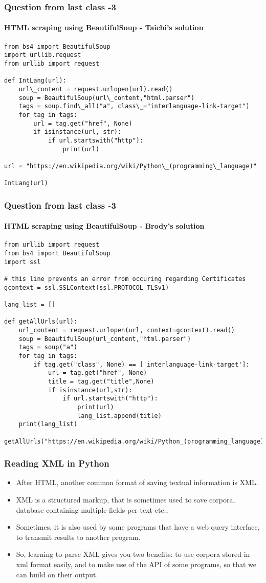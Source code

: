 \documentclass{beamer}
\begin{document}
\begin{frame}[fragile]
\frametitle{Question from last class -3}
\framesubtitle{HTML scraping using BeautifulSoup - Taichi's solution}
\tiny
\begin{verbatim}
from bs4 import BeautifulSoup
import urllib.request
from urllib import request

def IntLang(url):
    url\_content = request.urlopen(url).read()
    soup = BeautifulSoup(url\_content,"html.parser")
    tags = soup.find\_all("a", class\_="interlanguage-link-target")
    for tag in tags:
        url = tag.get("href", None)
        if isinstance(url, str):
            if url.startswith("http"):
                print(url)

url = "https://en.wikipedia.org/wiki/Python\_(programming\_language)"

IntLang(url)
\end{verbatim}
\end{frame}

\begin{frame}[fragile]
\frametitle{Question from last class -3}
\framesubtitle{HTML scraping using BeautifulSoup - Brody's solution}
\tiny
\begin{verbatim}
from urllib import request
from bs4 import BeautifulSoup
import ssl

# this line prevents an error from occuring regarding Certificates
gcontext = ssl.SSLContext(ssl.PROTOCOL_TLSv1)

lang_list = []

def getAllUrls(url):
    url_content = request.urlopen(url, context=gcontext).read()
    soup = BeautifulSoup(url_content,"html.parser")
    tags = soup("a")
    for tag in tags:
        if tag.get("class", None) == ['interlanguage-link-target']:
            url = tag.get("href", None)
            title = tag.get("title",None)
            if isinstance(url,str):
                if url.startswith("http"):
                    print(url)
                    lang_list.append(title)
    print(lang_list)

getAllUrls("https://en.wikipedia.org/wiki/Python_(programming_language)")
\end{verbatim}
\end{frame}

\begin{frame}
\frametitle{Reading XML in Python}
\begin{itemize}
\item After HTML, another common format of saving textual information is XML. 
\item XML is a structured markup, that is sometimes used to save corpora, database containing multiple fields per text etc.,
\item Sometimes, it is also used by some programs that have a web query interface, to transmit results to another program. 
\item So, learning to parse XML gives you two benefits: to use corpora stored in xml format easily, and to make use of the API of some programs, so that we can build on their output.
\end{itemize}
\end{frame}
\end{document}
